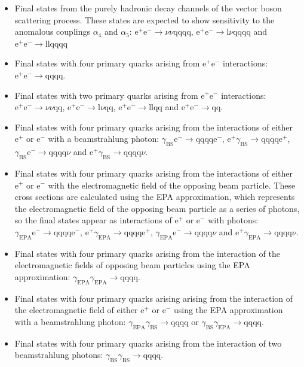 \begin{itemize}
\item Final states from the purely hadronic decay channels of the vector boson scattering process.  These states are expected to show sensitivity to the anomalous couplings $\alpha_{4}$ and $\alpha_{5}$: $\text{e}^{+}\text{e}^{-} \rightarrow \nu\nu\text{qqqq}$, $\text{e}^{+}\text{e}^{-} \rightarrow \text{l}\nu\text{qqqq}$ and $\text{e}^{+}\text{e}^{-} \rightarrow \text{llqqqq}$
\item Final states with four primary quarks arising from $\text{e}^{+}\text{e}^{-}$ interactions: $\text{e}^{+}\text{e}^{-} \rightarrow \text{qqqq}$.
\item Final states with two primary quarks arising from $\text{e}^{+}\text{e}^{-}$ interactions: $\text{e}^{+}\text{e}^{-} \rightarrow \nu{\nu}\text{qq}$, $\text{e}^{+}\text{e}^{-} \rightarrow \text{l}\nu\text{qq}$, $\text{e}^{+}\text{e}^{-} \rightarrow \text{llqq}$ and $\text{e}^{+}\text{e}^{-} \rightarrow \text{qq}$.
\item Final states with four primary quarks arising from the interactions of either $\text{e}^{+}$ or $\text{e}^{-}$ with a beamstrahlung photon: $\gamma_{\text{BS}}\text{e}^{-} \rightarrow \text{qqqq}\text{e}^{-}$, $\text{e}^{+}\gamma_{\text{BS}} \rightarrow \text{qqqq}\text{e}^{+}$, $\gamma_{\text{BS}}\text{e}^{-} \rightarrow \text{qqqq}\nu$ and $\text{e}^{+}\gamma_{\text{BS}} \rightarrow \text{qqqq}\nu$.
\item Final states with four primary quarks arising from the interactions of either $\text{e}^{+}$ or $\text{e}^{-}$ with the electromagnetic field of the opposing beam particle.  These cross sections are calculated using the EPA approximation, which represents the electromagnetic field of the opposing beam particle as a series of photons, so the final states appear as interactions of $\text{e}^{+}$ or $\text{e}^{-}$ with photons: $\gamma_{\text{EPA}}\text{e}^{-} \rightarrow \text{qqqq}\text{e}^{-}$, $\text{e}^{+}\gamma_{\text{EPA}} \rightarrow \text{qqqq}\text{e}^{+}$, $\gamma_{\text{EPA}}\text{e}^{-} \rightarrow \text{qqqq}\nu$ and $\text{e}^{+}\gamma_{\text{EPA}} \rightarrow \text{qqqq}\nu$.
\item Final states with four primary quarks arising from the interaction of the electromagnetic fields of opposing beam particles using the EPA approximation: $\gamma_{\text{EPA}}\gamma_{\text{EPA}} \rightarrow \text{qqqq}$.
\item Final states with four primary quarks arising arising from the interaction of the electromagnetic field of either $\text{e}^{+}$ or $\text{e}^{-}$ using the EPA approximation with a beamstrahlung photon: $\gamma_{\text{EPA}}\gamma_{\text{BS}} \rightarrow \text{qqqq}$ or $\gamma_{\text{BS}}\gamma_{\text{EPA}} \rightarrow \text{qqqq}$.
\item Final states with four primary quarks arising from the interaction of two beamstrahlung photons: $\gamma_{\text{BS}}\gamma_{\text{BS}} \rightarrow \text{qqqq}$.
\end{itemize}
